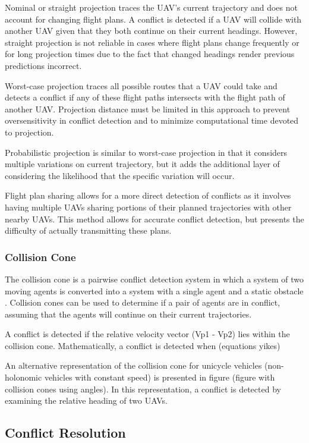 \documentclass[conference]{IEEEtran}
\begin{document}
Nominal or straight projection traces the UAV’s current trajectory and does not account for changing flight plans.  A conflict is detected if a UAV will collide with another UAV given that they both continue on their current headings.  However, straight projection is not reliable in cases where flight plans change frequently or for long projection times due to the fact that changed headings render previous predictions incorrect.

Worst-case projection traces all possible routes that a UAV could take and detects a conflict if any of these flight paths intersects with the flight path of another UAV.  Projection distance must be limited in this approach to prevent oversensitivity in conflict detection and to minimize computational time devoted to projection.

Probabilistic projection is similar to worst-case projection in that it considers multiple variations on current trajectory, but it adds the additional layer of considering the likelihood that the specific variation will occur.  

Flight plan sharing allows for a more direct detection of conflicts as it involves having multiple UAVs sharing portions of their planned trajectories with other nearby UAVs.  This method allows for accurate conflict detection, but presents the difficulty of actually transmitting these plans.  

\subsubsection{Collision Cone}
The collision cone is a pairwise conflict detection system in which a system of two moving agents is converted into a system with a single agent and a static obstacle \cite{danielscollision}.  Collision cones can be used to determine if a pair of agents are in conflict, assuming that the agents will continue on their current trajectories.

A conflict is detected if the relative velocity vector (Vp1 - Vp2) lies within the collision cone. Mathematically, a conflict is detected when (equations yikes)


An alternative representation of the collision cone for unicycle vehicles (non-holonomic vehicles with constant speed) is presented in figure (figure with collision cones using angles).  In this representation, a conflict is detected by examining the relative heading of two UAVs.

\subsection{Conflict Resolution}
\end{document}
